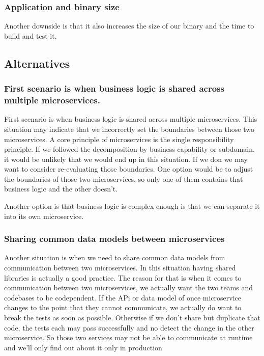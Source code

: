 \documentclass[a4paper, 11pt]{book}
\begin{document}
    \subsubsection{Application and binary size}
    Another downside is that it also increases the size of our binary and the time to build and test it.

    \subsection{Alternatives}

    \subsubsection{First scenario is when business logic is shared across multiple microservices.}
    First scenario is when business logic is shared across multiple microservices.
    This situation may indicate that we incorrectly set the boundaries between those two microservices.
    A core principle of microservices is the single responsibility principle.
    If we followed the decomposition by business capability or subdomain, it would be unlikely that we would end up in this situation.
    If we don we may want to consider re-evaluating those boundaries.
    One option would be to adjust the boundaries of those two microservices, so only one of them contains that business logic and the other doesn't.

    Another option is that business logic is complex enough is that we can separate it into its own microservice.

    \subsubsection{Sharing common data models between microservices}
    Another situation is when we need to share common data models from communication between two microservices.
    In this situation having shared libraries is actually a good practice.
    The reason for that is when it comes to communication between two microservices, we actually want the two teams and codebases to be codependent.
    If the APi or data model of once microservice changes to the point that they cannot communicate, we actually do want to break the tests as soon as possible.
    Otherwise if we don't share but duplicate that code, the tests each may pass successfully and no detect the change in the other microservice.
    So those two services may not be able to communicate at runtime and we'll only find out about it only in production
\end{document}
